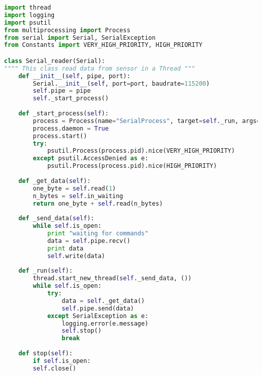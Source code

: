 \documentclass[hidelinks,11pt,a4paper,oneside,article]{memoir}
\begin{document}
\begin{lstlisting}[label={listing:serial-reader},caption={Serial Reader Class},language=Python, style=styleprogrammingappendix]
import thread
import logging
import psutil
from multiprocessing import Process
from serial import Serial, SerialException
from Constants import VERY_HIGH_PRIORITY, HIGH_PRIORITY

class Serial_reader(Serial):
"""" This class read data from sensor in a Thread """
    def __init__(self, pipe, port):
        Serial.__init__(self, port=port, baudrate=115200)
        self.pipe = pipe
        self._start_process()
    
    def _start_process(self):
        process = Process(name="SerialProcess", target=self._run, args=())
        process.daemon = True
        process.start()
        try:
            psutil.Process(process.pid).nice(VERY_HIGH_PRIORITY)
        except psutil.AccessDenied as e:
            psutil.Process(process.pid).nice(HIGH_PRIORITY)
    
    def _get_data(self):
        one_byte = self.read(1)
        n_bytes = self.in_waiting
        return one_byte + self.read(n_bytes)
    
    def _send_data(self):
        while self.is_open:
            print "waiting for commands"
            data = self.pipe.recv()
            print data
            self.write(data)
    
    def _run(self):
        thread.start_new_thread(self._send_data, ())
        while self.is_open:
            try:
                data = self._get_data()
                self.pipe.send(data)
            except SerialException as e:
                logging.error(e.message)
                self.stop()
                break
    
    def stop(self):
        if self.is_open:
        self.close()

\end{lstlisting}\vspace{14pt}
\end{document}
